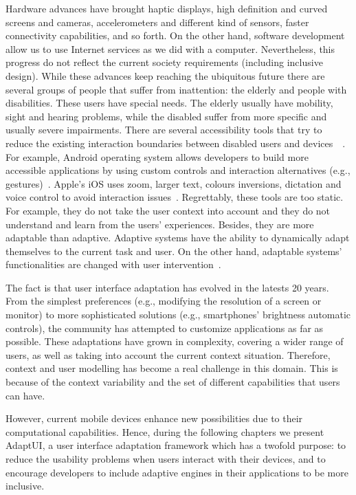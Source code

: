 Hardware advances have brought haptic displays, high definition and curved 
screens and cameras, accelerometers and different kind of sensors, faster 
connectivity capabilities, and so forth. On the other hand, software development
allow us to use Internet services as we did with a computer. Nevertheless,
this progress do not reflect the current society requirements (including
inclusive design). While these advances keep reaching the ubiquitous future
there are several groups of people that suffer from inattention: the elderly and
people with disabilities. These users have special needs. The elderly usually
have mobility, sight and hearing problems, while the disabled suffer from more
specific and usually severe impairments. There are several accessibility tools
that try to reduce the existing interaction boundaries between disabled users
and devices~\citep{gregor_designing_2002}~\citep{burgstahler_designing_2002}.
For example, Android operating system allows developers to build more accessible 
applications by using custom controls and interaction alternatives (e.g.,
gestures)~\citep{android_accessibility}. Apple's iOS uses zoom, larger text,
colours inversions, dictation and voice control to avoid interaction
issues~\citep{ios_accessibility}. Regrettably, these tools are too static. For
example, they do not take the user context into account and they do not understand
and learn from the users' experiences. Besides, they are more adaptable than 
adaptive. Adaptive systems have the ability to dynamically adapt themselves to 
the current task and user. On the other hand, adaptable systems' functionalities 
are changed with user intervention~\citep{fischer_user_2001}.

The fact is that user interface adaptation has evolved in the latests 20 years.
From the simplest preferences (e.g., modifying the resolution of a screen or
monitor) to more sophisticated solutions (e.g., smartphones' brightness automatic
controls), the community has attempted to customize applications as far as 
possible. These adaptations have grown in complexity, covering a wider range of 
users, as well as taking into account the current context situation. Therefore, 
context and user modelling has become a real challenge in this domain. This is 
because of the context variability and the set of different capabilities that 
users can have.

However, current mobile devices enhance new possibilities due to their 
computational capabilities. Hence, during the following chapters we present 
AdaptUI, a user interface adaptation framework which has a twofold purpose: to 
reduce the usability problems when users interact with their devices, and to 
encourage developers to include adaptive engines in their applications to be 
more inclusive.






